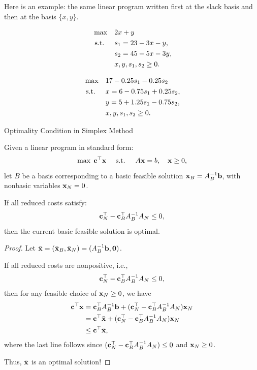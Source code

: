 Here is an example: the same linear program written first at the slack basis and then at the basis $\{x, y\}$.

\[
\begin{aligned}
\max\quad & 2x + y \\
\mbox{ s.t. }\quad & s_1 = 23 - 3x - y,\\ 
& s_2 = 45 - 5x - 3y,\\ 
& x, y, s_1, s_2 \ge 0.
\end{aligned}
\]

\[
\begin{aligned}
\max\quad & 17 - 0.25s_1 - 0.25s_2 \\
\mbox{ s.t. }\quad & x = 6 - 0.75s_1 + 0.25s_2,\\ 
& y = 5 + 1.25s_1 - 0.75s_2,\\ 
& x, y, s_1, s_2 \ge 0.
\end{aligned}
\]

\begin{theorem}{Optimality Condition in Simplex Method}{}

    Given a linear program in standard form:
    \[
    \max \; \mathbf{c}^\top \mathbf{x} \quad \mbox{ s.t. } \quad A \mathbf{x} = b, \quad \mathbf{x} \geq 0,
    \]
    let \(B\) be a basis corresponding to a basic feasible solution \( \mathbf{x}_B = A_B^{-1}\mathbf{b}\), with nonbasic variables \( \mathbf{x}_N = 0 \).

    If all reduced costs satisfy:
    \[
   \mathbf{c}_N^\top -\mathbf{c}_B^\top A_B^{-1} A_N \leq 0,
    \]
    then the current basic feasible solution is optimal.
\end{theorem}
\begin{proof}
Let $\bar {\mathbf{x}} = (\bar {\mathbf{x}}_B, \bar {\mathbf{x}}_N) = (A_B^{-1}\mathbf{b}, \mathbf{0})$.

    If all reduced costs are nonpositive, i.e.,
    \[
   \mathbf{c}_N^\top -\mathbf{c}_B^\top A_B^{-1} A_N \leq 0,
    \]
    then for any feasible choice of \( \mathbf{x}_N \geq 0 \), 
    we have
    \begin{align}
    \mathbf{c}^\top \mathbf{x} &= \mathbf{c}_B^\top A_B^{-1}\mathbf{b}+  (\mathbf{c}_N^\top -\mathbf{c}_B^\top A_B^{-1} A_N )\mathbf{x}_N\\
    &= \mathbf{c}^\top \bar {\mathbf{x}} +  (\mathbf{c}_N^\top -\mathbf{c}_B^\top A_B^{-1} A_N )\mathbf{x}_N\\
    & \leq \mathbf{c}^\top \bar {\mathbf{x}},
    \end{align}
    where the last line follows since $(\mathbf{c}_N^\top -\mathbf{c}_B^\top A_B^{-1} A_N ) \leq 0$ and $\mathbf{x}_N \geq 0$.
    
    Thus, $\bar {\mathbf{x}}$ is an optimal solution!
\end{proof}

